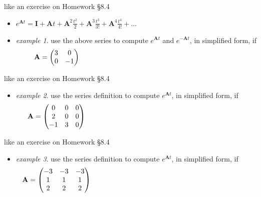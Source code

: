 \documentclass[dvipsnames,colorlinks]{beamer}
\newcommand{\bA}{\mathbf{A}}
\newcommand{\bI}{\mathbf{I}}
\begin{document}
\begin{frame}{like an exercise on Homework \S8.4}

\begin{itemize}
\item $e^{\bA t} = \bI + \bA t + \bA^2 \frac{t^2}{2} + \bA^3 \frac{t^3}{3!} + \bA^4 \frac{t^4}{4!} + \dots$

\medskip
\item \emph{example 1}.  use the above series to compute $e^{\bA t}$ and $e^{-\bA t}$, in simplified form, if
    $$\bA = \begin{pmatrix} 3 & 0 \\ 0 & -1 \end{pmatrix}     \hspace{80mm}$$
\end{itemize}

\vspace{40mm}
\end{frame}


\begin{frame}{like an exercise on Homework \S8.4}

\begin{itemize}
\item \emph{example 2}.  use the series definition to compute $e^{\bA t}$, in simplified form, if
    $$\bA = \begin{pmatrix} 0 & 0 & 0 \\ 2 & 0 & 0 \\ -1 & 3 & 0 \end{pmatrix}     \hspace{80mm}$$
\end{itemize}

\vspace{40mm}
\end{frame}


\begin{frame}{like an exercise on Homework \S8.4}

\begin{itemize}
\item \emph{example 3}.  use the series definition to compute $e^{\bA t}$, in simplified form, if
    $$\bA = \begin{pmatrix} -3 & -3 & -3 \\ 1 & 1 & 1 \\ 2 & 2 & 2 \end{pmatrix}     \hspace{80mm}$$
\end{itemize}

\vspace{40mm}
\end{frame}
\end{document}
